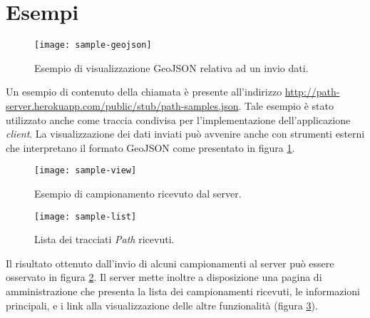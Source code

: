 \section{Esempi}
\begin{figure}[ht]
  \centering
  \texttt{[image: sample-geojson]}
  \caption{\footnotesize{Esempio di visualizzazione GeoJSON relativa ad un invio dati.}}
  \label{fig:sample-geojson}
\end{figure}
Un esempio di contenuto della chiamata è presente all'indirizzo \url{http://path-server.herokuapp.com/public/stub/path-samples.json}. Tale esempio è stato utilizzato anche come traccia condivisa per l'implementazione dell'applicazione \emph{client}. La visualizzazione dei dati inviati può avvenire anche con strumenti esterni che interpretano il formato GeoJSON come presentato in figura \ref{fig:sample-geojson}.

\begin{figure}[ht]
  \centering
  \texttt{[image: sample-view]}
  \caption{\footnotesize{Esempio di campionamento ricevuto dal server.}}
  \label{fig:sample-view}
\end{figure}

\begin{figure}[ht]
  \centering
  \texttt{[image: sample-list]}
  \caption{\footnotesize{Lista dei tracciati \emph{Path} ricevuti.}}
  \label{fig:sample-list}
\end{figure}
Il risultato ottenuto dall'invio di alcuni campionamenti al server può essere osservato in figura \ref{fig:sample-view}. Il server mette inoltre a disposizione una pagina di amministrazione che presenta la lista dei campionamenti ricevuti, le informazioni principali, e i link alla visualizzazione delle altre funzionalità (figura \ref{fig:sample-list}).
